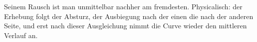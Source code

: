 Seinem Rausch ist man unmittelbar nachher am fremdesten. Physicalisch: der Erhebung folgt der Absturz, der Ausbiegung nach der einen die nach der anderen Seite, und erst nach dieser Ausgleichung nimmt die Curve wieder den mittleren Verlauf an.
\par

